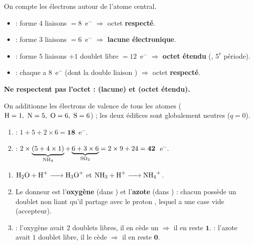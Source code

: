 \documentclass[11pt,a4paper]{article}
\begin{document}
\begin{corrige}
On compte les électrons autour de l'atome central.
\begin{itemize}[leftmargin=1.4em,topsep=2pt,itemsep=2pt]
  \item {} :  forme $4$ liaisons $= 8$~e$^-$ $\Rightarrow$ octet \textbf{respecté}.
  \item {} :  forme $3$ liaisons $= 6$~e$^-$ $\Rightarrow$ \textbf{lacune électronique}.
  \item {} :  forme $5$ liaisons $+ 1$ doublet libre $= 12$~e$^-$ $\Rightarrow$
        \textbf{octet étendu} (, $5^{\text{e}}$ période).
  \item {} : chaque  a $8$~e$^-$ (dont la double liaison ) $\Rightarrow$ octet
        \textbf{respecté}.
\end{itemize}
\textbf{Ne respectent pas l'octet :  (lacune) et  (octet étendu).}
\end{corrige}

\begin{corrige}
On additionne les électrons de valence de tous les atomes ($\ce{H}=1,\ \ce{N}=5,\ \ce{O}=6,\
\ce{S}=6$) ; les deux édifices sont globalement neutres ($q=0$).
\begin{enumerate}[label=\alph*)]
  \item {} : $1 + 5 + 2\times 6 = \mathbf{18}$~e$^-$.
  \item {} : $2\times\underbrace{(5 + 4\times 1)}_{\ce{NH4}} + \underbrace{6 + 3\times 6}_{\ce{SO3}}
        = 2\times 9 + 24 = \mathbf{42}$~e$^-$.
\end{enumerate}
\end{corrige}

\begin{corrige}
\begin{enumerate}[label=\alph*)]
  \item $\ce{H2O + H+ -> H3O+}$ \qquad et \qquad $\ce{NH3 + H+ -> NH4+}$.
  \item Le donneur est l'\textbf{oxygène} (dans \ce{H3O+}) et l'\textbf{azote} (dans ) :
        chacun possède un doublet non liant qu'il partage avec le proton \ce{H+}, lequel a une
        case vide (accepteur).
  \item {} : l'oxygène avait $2$ doublets libres, il en cède un $\Rightarrow$ il en
        reste $\mathbf{1}$. \quad \ce{NH4+} : l'azote avait $1$ doublet libre, il le cède
        $\Rightarrow$ il en reste $\mathbf{0}$.
\end{enumerate}
\end{corrige}
\end{document}
